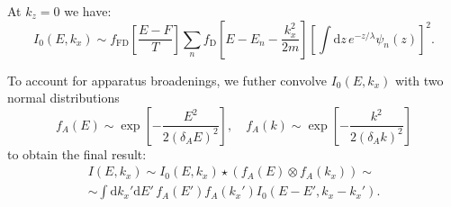 \documentclass[10pt]{article}
\newcommand{\dd}{\mathrm{d}}
\begin{document}
At $k_z = 0$ we have:
\begin{equation}
	I_0(E, k_x) \sim f_{\mathrm{FD}}\left[ \frac{E - F}{T} \right] \sum_n
		f_{\mathrm{D}}\left[ E - E_n - \frac{k_x^2}{2m} \right]
		\left[ \int \dd z \, e^{- z / \lambda}
		\psi_n(z) \right]^2.
\end{equation}

To account for apparatus broadenings, we futher convolve $I_0(E, k_x)$ with
two normal distributions
\begin{equation}
	f_A(E) \sim \exp\left[ -\frac{E^2}{2(\delta_A E)^2} \right], \quad
	f_A(k) \sim \exp\left[ -\frac{k^2}{2(\delta_A k)^2} \right]
\end{equation}
to obtain the final result:
\begin{multline}
	I(E, k_x) \sim I_0(E, k_x) \star (f_A(E) \otimes f_A(k_x)) \sim \\
	\sim \int \dd k_x' \dd E' \, f_A(E') f_A(k_x') I_0(E - E', k_x - k_x').
\end{multline}



\end{document}
